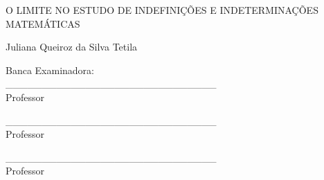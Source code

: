 \thispagestyle{plain}
\begin{center}


\LARGE{O LIMITE NO ESTUDO DE INDEFINIÇÕES E INDETERMINAÇÕES MATEMÁTICAS}


\vspace*{1.5cm}
\normalsize{Juliana Queiroz da Silva Tetila}

\vspace*{3cm}
\normalsize{
Banca Examinadora:\\

\vspace*{3cm}
\_\_\_\_\_\_\_\_\_\_\_\_\_\_\_\_\_\_\_\_\_\_\_\_\_\_\_\_\_\\
Professor  \\
\vspace*{3cm}



\_\_\_\_\_\_\_\_\_\_\_\_\_\_\_\_\_\_\_\_\_\_\_\_\_\_\_\_\_\\
Professor  \\
\vspace*{3cm}

\_\_\_\_\_\_\_\_\_\_\_\_\_\_\_\_\_\_\_\_\_\_\_\_\_\_\_\_\_\\
Professor  \\
\vspace*{3cm}
}
\end{center}


